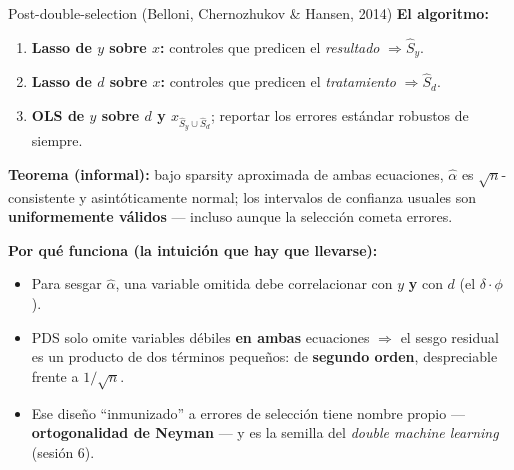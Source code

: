 \documentclass{beamer}
\newcommand{\1}{\mathbb{I}}
\begin{document}
\begin{frame}{Post-double-selection (Belloni, Chernozhukov \& Hansen, 2014)}
\small
\textbf{El algoritmo:}
\begin{enumerate}\itemsep5pt
  \item \textbf{Lasso de $y$ sobre $x$:} controles que predicen el \emph{resultado} $\Rightarrow \hat{S}_y$.
  \item \textbf{Lasso de $d$ sobre $x$:} controles que predicen el \emph{tratamiento} $\Rightarrow \hat{S}_d$.
  \item \textbf{OLS de $y$ sobre $d$ y $x_{\hat{S}_y \cup \hat{S}_d}$}; reportar los errores estándar robustos de siempre.
\end{enumerate}
\pause

\vspace{0.15cm}
\textbf{Teorema (informal):} bajo sparsity aproximada de ambas ecuaciones, $\hat{\alpha}$ es $\sqrt{n}$-consistente y asintóticamente normal; los intervalos de confianza usuales son \textbf{uniformemente válidos} --- incluso aunque la selección cometa errores.
\pause

\vspace{0.15cm}
\textbf{Por qué funciona (la intuición que hay que llevarse):}
\begin{itemize}\itemsep4pt
  \item Para sesgar $\hat{\alpha}$, una variable omitida debe correlacionar con $y$ \textbf{y} con $d$ (el $\delta \cdot \phi$).
  \item PDS solo omite variables débiles \textbf{en ambas} ecuaciones $\Rightarrow$ el sesgo residual es un producto de dos términos pequeños: de \textbf{segundo orden}, despreciable frente a $1/\sqrt{n}$.
  \item Ese diseño ``inmunizado'' a errores de selección tiene nombre propio --- \textbf{ortogonalidad de Neyman} --- y es la semilla del \emph{double machine learning} (sesión 6).
\end{itemize}
\end{frame}
\end{document}
